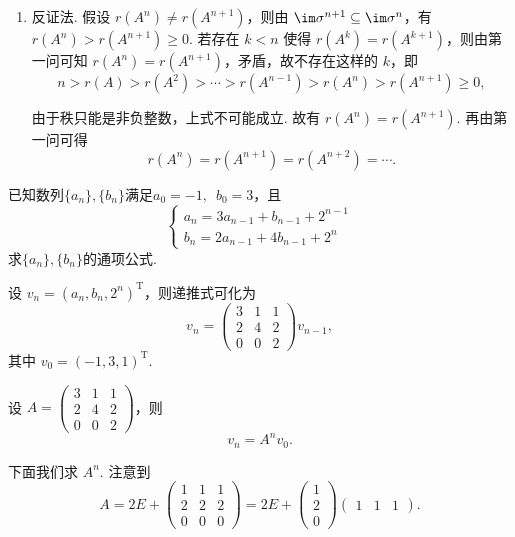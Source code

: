 \begin{exercise}
\begin{exgroup}
\begin{answer}
\begin{enumerate}
                \item 反证法. 假设 $r(A^n) \neq r(A^{n+1})$，则由 $\im \sigma^{n+1} \subseteq \im \sigma^n$，有 $r(A^n) > r(A^{n+1}) \geqslant 0$.
                    若存在 $k < n$ 使得 $r(A^k) = r(A^{k+1})$，则由第一问可知 $r(A^n) = r(A^{n+1})$，矛盾，故不存在这样的 $k$，即
                    \[
                        n > r(A) > r(A^2) > \cdots > r(A^{n-1}) > r(A^n) > r(A^{n+1}) \geqslant 0,
                    \]

                    由于秩只能是非负整数，上式不可能成立. 故有 $r(A^n) = r(A^{n+1})$. 再由第一问可得
                    \[
                        r(A^n) = r(A^{n+1}) = r(A^{n+2}) = \cdots.
                    \]

            \end{enumerate}
        \end{answer}
    \end{exgroup}

    \begin{exgroup}
        \item 已知数列$\{a_n\},\{b_n\}$满足$a_0=-1,\enspace b_0=3$，且
        \[\begin{cases}
                a_n=3a_{n-1}+b_{n-1}+2^{n-1} \\
                b_n=2a_{n-1}+4b_{n-1}+2^n
            \end{cases}\]
        求$\{a_n\},\{b_n\}$的通项公式.
        \begin{answer}
            设 $v_n = (a_n, b_n, 2^n)^\mathrm{T}$，则递推式可化为
            \[
                v_n = \begin{pmatrix}
                    3 & 1 & 1 \\ 2 & 4 & 2 \\ 0 & 0 & 2
                \end{pmatrix} v_{n-1},
            \]
            其中 $v_0 = (-1, 3, 1)^\mathrm{T}$.

            设 $A = \begin{pmatrix}
                3 & 1 & 1 \\ 2 & 4 & 2 \\ 0 & 0 & 2
            \end{pmatrix}$，则
            \[
                v_n = A^n v_0.
            \]

            下面我们求 $A^n$. 注意到
            \[
                A = 2E + \begin{pmatrix}
                    1 & 1 & 1 \\ 2 & 2 & 2 \\ 0 & 0 & 0
                  \end{pmatrix}
                  = 2E + \begin{pmatrix}
                      1 \\ 2 \\ 0
                  \end{pmatrix} \begin{pmatrix}
                      1 & 1 & 1
                  \end{pmatrix}.
            \]


\end{answer}
\end{exgroup}
\end{exercise}
